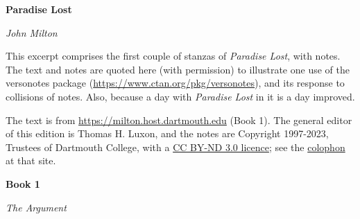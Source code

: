 \documentclass{scrartcl}
\begin{document}
\textbf{\Large Paradise Lost}

\emph{John Milton}

This excerpt comprises the first couple of stanzas of \emph{Paradise
  Lost}, with notes.  The text and notes are quoted here (with
permission) to illustrate one use of the versonotes package
(\url{https://www.ctan.org/pkg/versonotes}), and its response to
collisions of notes.  Also, because a day with \emph{Paradise Lost} in
it is a day improved.

The text is from
\url{https://milton.host.dartmouth.edu} (Book 1).
The general editor of this edition is Thomas H. Luxon, and the notes are
Copyright 1997-2023, Trustees of Dartmouth College, with a
\href{https://creativecommons.org/licenses/by-nd/3.0/us/}{CC BY-ND 3.0 licence};
see the
\href{https://milton.host.dartmouth.edu/reading_room/contents/about_mrr.shtml}{colophon}
at that site.

\pagebreak

\textbf{\Large Book 1}

\emph{The Argument}
\end{document}

